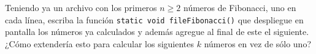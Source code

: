 \documentclass[dcc,uchile]{fcfmcourse}
\begin{document}
\begin{problems}
Teniendo ya un archivo con los primeros $n \ge 2$ números de Fibonacci, uno en cada línea, escriba la función \texttt{static void fileFibonacci()} que despliegue en pantalla los números ya calculados y además agregue al final de este el siguiente. ¿Cómo extendería esto para calcular los siguientes $k$ números en vez de sólo uno?
\end{problems}
\end{document}
